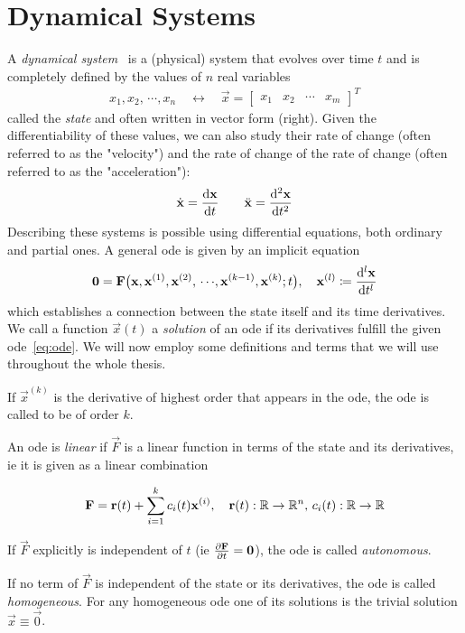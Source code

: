 	\section{Dynamical Systems}
		A \emph{dynamical system}~\cite{birkhoffDynamicalSystems1927} is a (physical) system that evolves over time \(t\) and is completely defined by the values of \(n\) real variables
		\begin{align*}
			x_1, x_2, \,\cdots\!, x_n \quad\longleftrightarrow\quad \vec{x} = \begin{bmatrix} x_1 & x_2 & \cdots & x_m \end{bmatrix}^T
		\end{align*}
		called the \emph{state} and often written in vector form (right). Given the differentiability of these values, we can also study their rate of change (often referred to as the "velocity") and the rate of change of the rate of change (often referred to as the "acceleration"):
		\begin{align*}
			\dot{\boldsymbol{\mathrm{x}}} = \dv{\boldsymbol{\mathrm{x}}}{t} \qquad \ddot{\boldsymbol{\mathrm{x}}} = \dv[2]{\boldsymbol{\mathrm{x}}}{t}
		\end{align*}
		Describing these systems is possible using differential equations, both ordinary and partial ones. A general \ac{ode} is given by an implicit equation
		\begin{align}
			\boldsymbol{\mathrm{0}} = \boldsymbol{\mathrm{F}}\big( \boldsymbol{\mathrm{x}}, \boldsymbol{\mathrm{x}}^{(1)}, \boldsymbol{\mathrm{x}}^{(2)}, \,\cdots\!, \boldsymbol{\mathrm{x}}^{(k - 1)}, \boldsymbol{\mathrm{x}}^{(k)}; t \big),\quad \boldsymbol{\mathrm{x}}^{(l)} \coloneqq \dv[l]{\boldsymbol{\mathrm{x}}}{t}  \label{eq:ode}
		\end{align}
		which establishes a connection between the state itself and its time derivatives. We call a function \( \vec{x}(t) \) a \emph{solution} of an \ac{ode} if its derivatives fulfill the given \ac{ode}~\eqref{eq:ode}. We will now employ some definitions and terms that we will use throughout the whole thesis.
		\begin{description}[leftmargin = 3cm]
			\item[Order] If \( \vec{x}^{(k)} \) is the derivative of highest order that appears in the \ac{ode}, the \ac{ode} is called to be of order \(k\).
			\item[Linearity] An \ac{ode} is \emph{linear} if \(\vec{F}\) is a linear function in terms of the state and its derivatives, \ac{ie} it is given as a linear combination
		\end{description}
		\begin{align*}
			\boldsymbol{\mathrm{F}} = \boldsymbol{\mathrm{r}}(t) + \sum_{i = 1}^{k} c_i(t) \boldsymbol{\mathrm{x}}^{(i)},\quad \boldsymbol{\mathrm{r}}(t) : \mathbb{R} \to \mathbb{R}^n,\, c_i(t) : \mathbb{R} \to \mathbb{R}
		\end{align*}
		\begin{description}[leftmargin = 3cm]
			\item[Autonomous] If \(\vec{F}\) explicitly is independent of \(t\) (\ac{ie} \( \pdv{\boldsymbol{\mathrm{F}}}{t} = \boldsymbol{\mathrm{0}} \)), the \ac{ode} is called \emph{autonomous}.
			\item[Homogenity] If no term  of \(\vec{F}\) is independent of the state or its derivatives, the \ac{ode} is called \emph{homogeneous}. For any homogeneous \ac{ode} one of its solutions is the trivial solution \( \vec{x} \equiv \vec{0} \).
		\end{description}

